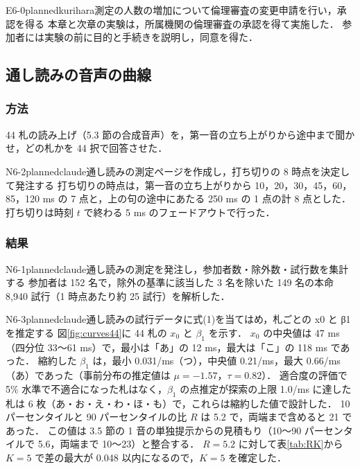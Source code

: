\begin{fd}{E6-0}{planned}{kurihara}{測定の人数の増加について倫理審査の変更申請を行い，承認を得る}
本章と次章の実験は，所属機関の倫理審査の承認を得て実施した．
参加者には実験の前に目的と手続きを説明し，同意を得た．
\end{fd}

\subsection{通し読みの音声の曲線}

\subsubsection{方法}
44 札の読み上げ（5.3 節の合成音声）を，第一音の立ち上がりから途中まで聞かせ，どの札かを 44 択で回答させた．
\begin{fd}{N6-2}{planned}{claude}{通し読みの測定ページを作成し，打ち切りの 8 時点を決定して発注する}
打ち切りの時点は，第一音の立ち上がりから 10，20，30，45，60，85，120 ms の 7 点と，上の句の途中にあたる 250 ms の 1 点の計 8 点とした．
打ち切りは時刻 $t$ で終わる 5 ms のフェードアウトで行った．
\end{fd}

\subsubsection{結果}
\begin{fd}{N6-1}{planned}{claude}{通し読みの測定を発注し，参加者数・除外数・試行数を集計する}
参加者は 152 名で，除外の基準に該当した 3 名を除いた 149 名の本命 8,940 試行（1 時点あたり約 25 試行）を解析した．
\end{fd}

\begin{fd}{N6-3}{planned}{claude}{通し読みの試行データに式(1)を当てはめ，札ごとの x0 と β1 を推定する}
図\ref{fig:curves44}に 44 札の $x_0$ と $\beta_1$ を示す．
$x_0$ の中央値は 47 ms（四分位 33〜61 ms）で，最小は「あ」の 12 ms，最大は「こ」の 118 ms であった．
縮約した $\beta_1$ は，最小 0.031/ms（つ），中央値 0.21/ms，最大 0.66/ms（あ）であった（事前分布の推定値は $\mu = -1.57$，$\tau = 0.82$）．
適合度の評価で 5\% 水準で不適合になった札はなく，$\beta_1$ の点推定が探索の上限 1.0/ms に達した札は 6 枚（あ・お・え・わ・ほ・も）で，これらは縮約した値で設計した．
10 パーセンタイルと 90 パーセンタイルの比 $R$ は 5.2 で，両端まで含めると 21 であった．
この値は 3.5 節の 1 音の単独提示からの見積もり（10〜90 パーセンタイルで 5.6，両端まで 10〜23）と整合する．
$R = 5.2$ に対して表\ref{tab:RK}から $K = 5$ で差の最大が 0.048 以内になるので，$K = 5$ を確定した．
\end{fd}

